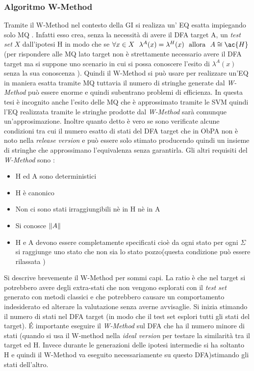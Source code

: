 \subsubsection{Algoritmo W-Method}

Tramite il W-Method nel contesto della \ac{GI} si realizza un' \ac{EQ} esatta impiegando solo \ac{MQ} \cite{Balanescu03}. Infatti esso crea, senza la necessità di avere il \ac{DFA} target A,  un \textit{test set}  $X$ dall'ipotesi \ac{H} in modo che se $\forall x \in X \:\:\: \lambda^{A}(x) = \lambda^{H}(x) \:\:\: \text{allora} \:\:\: A \cong \ac{H}$  (per rispondere alle \ac{MQ} lato target non è strettamente necessario avere il \ac{DFA} target ma si suppone uno scenario in cui si possa conoscere l'esito di $\lambda^{A}(x)$ senza la sua conoscenza ). Quindi il W-Method si può usare per realizzare un'\ac{EQ} in maniera esatta tramite \ac{MQ} tuttavia il numero di stringhe generate dal \textit{W-Method} può essere enorme e quindi subentrano problemi di efficienza. In questa tesi è incognito anche l'esito delle \ac{MQ} che è approssimato tramite le \ac{SVM} quindi l'\ac{EQ} realizzata tramite le stringhe prodotte dal \textit{W-Method} sarà comunque un'approsimazione. Inoltre quanto detto è vero se sono verificate alcune condizioni tra cui il numero esatto di stati del \ac{DFA} target   che in \ac{ObPA} non è noto nella \textit{release version} e può essere solo stimato producendo quindi un insieme di stringhe che approssimano l'equivalenza senza garantirla. Gli altri requisiti del \textit{W-Method} sono \cite{Balanescu03}:
\begin{itemize}
\item \ac{H} ed A sono deterministici
\item \ac{H} è canonico
\item Non ci sono stati irraggiungibili nè in \ac{H} nè in A
\item Si conosce $\lVert A\rVert$
\item \ac{H} e A devono essere completamente specificati cioè da ogni stato per ogni $\Sigma$ si raggiunge uno stato che non sia lo stato pozzo(questa condizione può essere rilassata \cite{Balanescu03})
\end{itemize}
Si descrive brevemente il W-Method per sommi capi.   La ratio è che nel target si potrebbero avere degli extra-stati che non vengono esplorati con il \textit{test set} generato con metodi classici e che potrebbero causare un comportamento indesiderato ed alterare la valutazione senza averne avvisaglie. Si inizia stimando il numero di stati nel \ac{DFA} target (in modo che il test set esplori tutti gli stati del target). \'E importante eseguire il \textit{W-Method} sul \ac{DFA}  che ha il numero minore di stati (quando si usa il W-method nella \textit{ideal version} per testare la similarità tra il target ed \ac{H}. Invece durante le generazioni delle ipotesi intermedie si ha soltanto \ac{H} e quindi il W-Method va eseguito necessariamente su questo \ac{DFA})stimando gli stati dell'altro.\\
